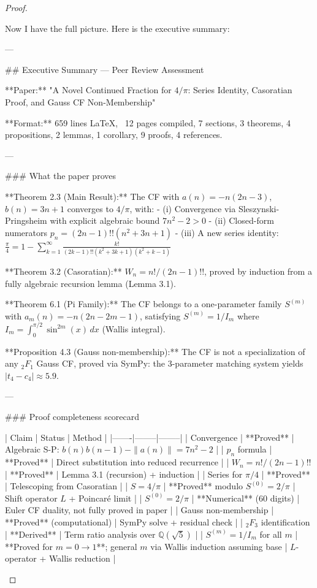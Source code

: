 \begin{theorem}
\begin{lemma}
\begin{proposition}
\begin{corollary}
\begin{proof}
\begin{remark}
Now I have the full picture. Here is the executive summary:

---

## Executive Summary — Peer Review Assessment

**Paper:** "A Novel Continued Fraction for $4/\pi$: Series Identity, Casoratian Proof, and Gauss CF Non-Membership"

**Format:** 659 lines LaTeX, ~12 pages compiled, 7 sections, 3 theorems, 4 propositions, 2 lemmas, 1 corollary, 9 proofs, 4 references.

---

### What the paper proves

**Theorem 2.3 (Main Result):** The CF with $a(n) = -n(2n-3)$, $b(n) = 3n+1$ converges to $4/\pi$, with:
- (i) Convergence via Sleszynski-Pringsheim with explicit algebraic bound $7n^2-2 > 0$
- (ii) Closed-form numerators $p_n = (2n-1)!!(n^2+3n+1)$
- (iii) A new series identity: $\frac{\pi}{4} = 1 - \sum_{k=1}^{\infty} \frac{k!}{(2k-1)!!(k^2+3k+1)(k^2+k-1)}$

**Theorem 3.2 (Casoratian):** $W_n = n!/(2n-1)!!$, proved by induction from a fully algebraic recursion lemma (Lemma 3.1).

**Theorem 6.1 (Pi Family):** The CF belongs to a one-parameter family $S^{(m)}$ with $a_m(n) = -n(2n-2m-1)$, satisfying $S^{(m)} = 1/I_m$ where $I_m = \int_0^{\pi/2} \sin^{2m}(x)\,dx$ (Wallis integral).

**Proposition 4.3 (Gauss non-membership):** The CF is not a specialization of any $_2F_1$ Gauss CF, proved via SymPy: the 3-parameter matching system yields $|t_4 - c_4| \approx 5.9$.

---

### Proof completeness scorecard

| Claim | Status | Method |
|-------|--------|--------|
| Convergence | **Proved** | Algebraic S-P: $b(n)b(n-1) - \|a(n)\| = 7n^2 - 2$ |
| $p_n$ formula | **Proved** | Direct substitution into reduced recurrence |
| $W_n = n!/(2n-1)!!$ | **Proved** | Lemma 3.1 (recursion) + induction |
| Series for $\pi/4$ | **Proved** | Telescoping from Casoratian |
| $S = 4/\pi$ | **Proved** modulo $S^{(0)} = 2/\pi$ | Shift operator $L$ + Poincaré limit |
| $S^{(0)} = 2/\pi$ | **Numerical** (60 digits) | Euler CF duality, not fully proved in paper |
| Gauss non-membership | **Proved** (computational) | SymPy solve + residual check |
| $_2F_3$ identification | **Derived** | Term ratio analysis over $\mathbb{Q}(\sqrt{5})$ |
| $S^{(m)} = 1/I_m$ for all $m$ | **Proved for $m=0 \to 1$**; general $m$ via Wallis induction assuming base | $L$-operator + Wallis reduction |


\end{remark}
\end{proof}
\end{corollary}
\end{proposition}
\end{lemma}
\end{theorem}
